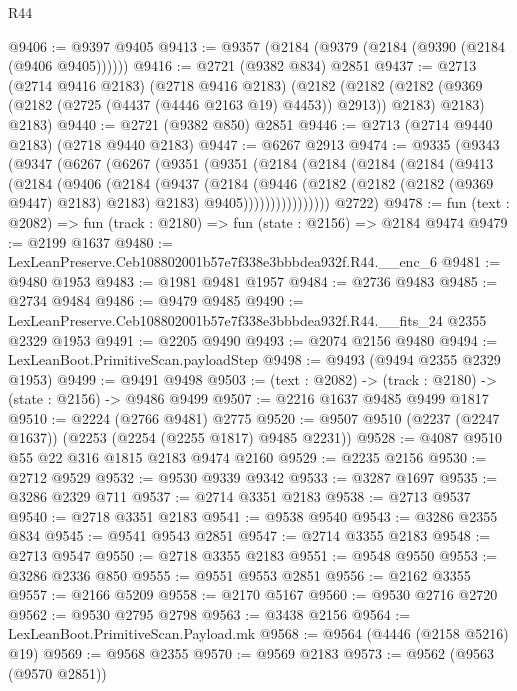 \begin{lexlean}{R44}
\begin{coremodule}
@9406 := @9397 @9405
@9413 := @9357 (@2184 (@9379 (@2184 (@9390 (@2184 (@9406 @9405))))))
@9416 := @2721 (@9382 @834) @2851
@9437 := @2713
    (@2714 @9416 @2183)
    (@2718 @9416 @2183)
    (@2182
      (@2182 (@2182 (@9369 (@2182 (@2725 (@4437 (@4446 @2163 @19) @4453)) @2913)) @2183) @2183)
      @2183)
@9440 := @2721 (@9382 @850) @2851
@9446 := @2713 (@2714 @9440 @2183) (@2718 @9440 @2183)
@9447 := @6267 @2913
@9474 := @9335
    (@9343
      (@9347
        (@6267
          (@6267
            (@9351
              (@9351
                (@2184
                  (@2184
                    (@2184
                      (@2184
                        (@9413
                          (@2184
                            (@9406
                              (@2184
                                (@9437
                                  (@2184
                                    (@9446
                                      (@2182 (@2182 (@2182 (@9369 @9447) @2183) @2183) @2183)
                                      @9405))))))))))))))))
      @2722)
@9478 := fun (text : @2082) => fun (track : @2180) => fun (state : @2156) => @2184 @9474
@9479 := @2199 @1637
@9480 := LexLeanPreserve.Ceb108802001b57e7f338e3bbbdea932f.R44.__enc_6
@9481 := @9480 @1953
@9483 := @1981 @9481 @1957
@9484 := @2736 @9483
@9485 := @2734 @9484
@9486 := @9479 @9485
@9490 := LexLeanPreserve.Ceb108802001b57e7f338e3bbbdea932f.R44.__fits_24 @2355 @2329 @1953
@9491 := @2205 @9490
@9493 := @2074 @2156 @9480
@9494 := LexLeanBoot.PrimitiveScan.payloadStep
@9498 := @9493 (@9494 @2355 @2329 @1953)
@9499 := @9491 @9498
@9503 := (text : @2082) -> (track : @2180) -> (state : @2156) -> @9486 @9499
@9507 := @2216 @1637 @9485 @9499 @1817
@9510 := @2224 (@2766 @9481) @2775
@9520 := @9507 @9510 (@2237 (@2247 @1637)) (@2253 (@2254 (@2255 @1817) @9485 @2231))
@9528 := @4087 @9510 @55 @22 @316 @1815 @2183 @9474 @2160
@9529 := @2235 @2156
@9530 := @2712 @9529
@9532 := @9530 @9339 @9342
@9533 := @3287 @1697
@9535 := @3286 @2329 @711
@9537 := @2714 @3351 @2183
@9538 := @2713 @9537
@9540 := @2718 @3351 @2183
@9541 := @9538 @9540
@9543 := @3286 @2355 @834
@9545 := @9541 @9543 @2851
@9547 := @2714 @3355 @2183
@9548 := @2713 @9547
@9550 := @2718 @3355 @2183
@9551 := @9548 @9550
@9553 := @3286 @2336 @850
@9555 := @9551 @9553 @2851
@9556 := @2162 @3355
@9557 := @2166 @5209
@9558 := @2170 @5167
@9560 := @9530 @2716 @2720
@9562 := @9530 @2795 @2798
@9563 := @3438 @2156
@9564 := LexLeanBoot.PrimitiveScan.Payload.mk
@9568 := @9564 (@4446 (@2158 @5216) @19)
@9569 := @9568 @2355
@9570 := @9569 @2183
@9573 := @9562 (@9563 (@9570 @2851))

\end{coremodule}
\end{lexlean}
